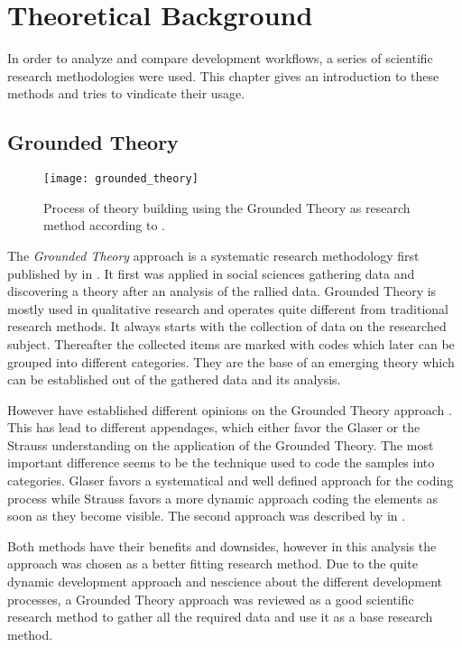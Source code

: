 \chapter{Theoretical Background} %
\label{chap:theoretical background}

In order to analyze and compare development workflows, a series of scientific
research methodologies were used. This chapter gives an introduction to these
methods and tries to vindicate their usage.

\section{Grounded Theory} %

\begin{figure}[htbp]
  \centering
  \texttt{[image: grounded\_theory]}
  \caption[Grounded Theory Process]
  {Process of theory building using the Grounded Theory as research method
    according to \citeauthor{Strauss1990} \cite{Pandit1996}.}
\end{figure}

The \emph{Grounded Theory} approach is a systematic research methodology first
published by \textcite{Glaser1967} in \citeyear{Glaser1967}. It first was
applied in social sciences gathering data and discovering a theory after an
analysis of the rallied data. Grounded Theory is mostly used in qualitative
research and operates quite different from traditional research methods. It
always starts with the collection of data on the researched subject. Thereafter
the collected items are marked with codes which later can be grouped into
different categories. They are the base of an emerging theory which can be
established out of the gathered data and its analysis.

However \citeauthor{Glaser1967} have established different opinions on the
Grounded Theory approach \cite{Heath2004}. This has lead to different
appendages, which either favor the Glaser or the Strauss understanding on the
application of the Grounded Theory. The most important difference seems to be
the technique used to code the samples into categories. Glaser favors a
systematical and well defined approach for the coding process while Strauss
favors a more dynamic approach coding the elements as soon as they become
visible. The second approach was described by \textcite{Strauss1990} in
\citeyear{Strauss1990}.

Both methods have their benefits and downsides, however in this analysis the
\citeauthor{Strauss1990} approach was chosen as a better fitting research
method. Due to the quite dynamic development approach and nescience about the
different development processes, a Grounded Theory approach was reviewed as a
good scientific research method to gather all the required data and use it as a
base research method.


